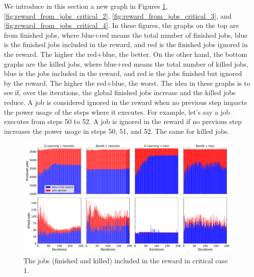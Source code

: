 We introduce in this section a new graph in Figures \ref{fig:reward_from_jobs_critical_1}, \ref{fig:reward_from_jobs_critical_2}, \ref{fig:reward_from_jobs_critical_3}, and \ref{fig:reward_from_jobs_critical_4}. In these figures, the graphs on the top are from finished jobs, where blue+red means the total number of finished jobs, blue is the finished jobs included in the reward, and red is the finished jobs ignored in the reward. The higher the red+blue, the better. On the other hand, the bottom graphs are the killed jobs, where blue+red means the total number of killed jobs, blue is the jobs included in the reward, and red is the jobs finished but ignored by the reward. The higher the red+blue, the worst. The idea in these graphs is to see if, over the iterations, the global finished jobs increase and the killed jobs reduce. A job is considered ignored in the reward when no previous step impacts the power usage of the steps where it executes. For example, let's say a job executes from steps 50 to 52. A job is ignored in the reward if no previous step increases the power usage in steps 50, 51, and 52. The same for killed jobs.

\begin{figure}[!htb]
    \centering
    \includegraphics[scale=0.33]{Images/Learning_compensations/ignored_jobs_touched_scenario_1.pdf}
    \caption{The  jobs (finished and killed) included in the reward in critical case 1.}
    \label{fig:reward_from_jobs_critical_1}
\end{figure}

